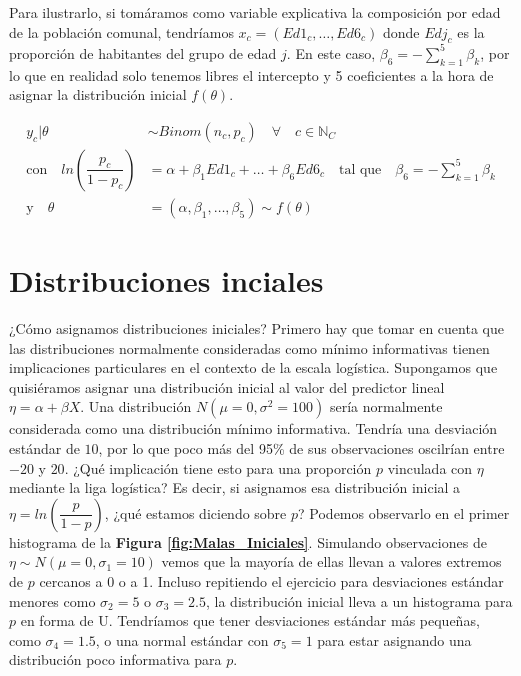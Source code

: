 Para ilustrarlo, si tomáramos como variable explicativa la composición por edad de la población comunal, tendríamos $x_c=(Ed1_c, \dots, Ed6_c)$ donde $Edj_c$ es la proporción de habitantes del grupo de edad $j$. En este caso, $\beta_{6} = -\sum\limits_{k = 1}^5 \beta_k$, por lo que en realidad solo tenemos libres el intercepto y 5 coeficientes a la hora de asignar la distribución inicial $f(\theta)$. 

\begin{align*}
y_c|\theta & \sim Binom(n_c,p_c) \quad \forall \quad c \in \mathbb{N}_C \\
\text{con} \quad ln\left(\dfrac{p_c}{1-p_c}\right) &= \alpha + \beta_1Ed1_c + \dots + \beta_6Ed6_c \quad \text{tal que} \quad \beta_6 = -\sum\limits_{k = 1}^5 \beta_k \nonumber \\
\text{y} \quad \theta &= (\alpha,\beta_1,\dots,\beta_5) \sim f(\theta) 
\end{align*}

\section{Distribuciones inciales}

¿Cómo asignamos distribuciones iniciales? Primero hay que tomar en cuenta que las distribuciones normalmente consideradas como mínimo informativas tienen implicaciones particulares en el contexto de la escala logística. Supongamos que quisiéramos asignar una distribución inicial al valor del predictor lineal $\eta = \alpha + \beta X$. Una distribución $N(\mu=0,\sigma^2=100)$ sería normalmente considerada como una distribución mínimo informativa. Tendría una desviación estándar de $10$, por lo que poco más del 95\% de sus observaciones oscilrían entre $-20$ y $20$. ¿Qué implicación tiene esto para una proporción $p$ vinculada con $\eta$ mediante la liga logística? Es decir, si asignamos esa distribución inicial a $\eta=ln\left(\dfrac{p}{1-p}\right)$, ¿qué estamos diciendo sobre $p$? Podemos observarlo en el primer histograma de la \textbf{Figura \ref{fig:Malas_Iniciales}}. Simulando observaciones de $\eta\sim N(\mu=0,\sigma_1=10)$ vemos que la mayoría de ellas llevan a valores extremos de $p$ cercanos a 0 o a 1. Incluso repitiendo el ejercicio para desviaciones estándar menores como $\sigma_2=5$ o $\sigma_3=2.5$, la distribución inicial lleva a un histograma para $p$ en forma de U. Tendríamos que tener desviaciones estándar más pequeñas, como $\sigma_4=1.5$, o una normal estándar con $\sigma_5=1$ para estar asignando una distribución poco informativa para $p$.\\ 


